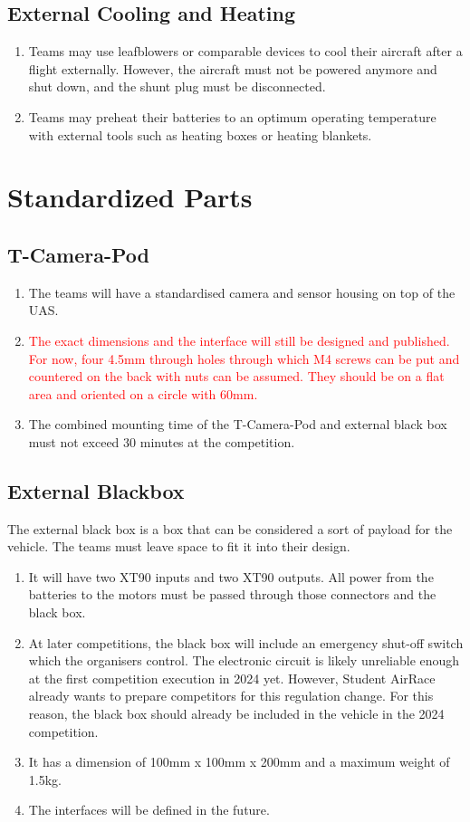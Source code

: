 \documentclass{article}
\begin{document}
\subsection{External Cooling and Heating}
\begin{enumerate}
  \item Teams may use leafblowers or comparable devices to cool their aircraft after a flight externally. However, the aircraft must not be powered anymore and shut down, and the shunt plug must be disconnected.  
  \item Teams may preheat their batteries to an optimum operating temperature with external tools such as heating boxes or heating blankets.
\end{enumerate}

\section{Standardized Parts}

\subsection{T-Camera-Pod}
\begin{enumerate}
  \item The teams will have a standardised camera and sensor housing on top of the UAS.
  \item \textcolor{red}{The exact dimensions and the interface will still be designed and published. For now, four 4.5mm through holes through which M4 screws can be put and countered on the back with nuts can be assumed. They should be on a flat area and oriented on a circle with 60mm.}
  \item The combined mounting time of the T-Camera-Pod and external black box must not exceed 30 minutes at the competition. 
\end{enumerate}



\subsection{External Blackbox}
The external black box is a box that can be considered a sort of payload for the vehicle. The teams must leave space to fit it into their design.
\begin{enumerate}
  \item It will have two XT90 inputs and two XT90 outputs. All power from the batteries to the motors must be passed through those connectors and the black box.
  \item At later competitions, the black box will include an emergency shut-off switch which the organisers control. The electronic circuit is likely unreliable enough at the first competition execution in 2024 yet. However, Student AirRace already wants to prepare competitors for this regulation change. For this reason, the black box should already be included in the vehicle in the 2024 competition.
  \item It has a dimension of 100mm x 100mm x 200mm and a maximum weight of 1.5kg.
  \item The interfaces will be defined in the future. 
\end{enumerate}
\end{document}
